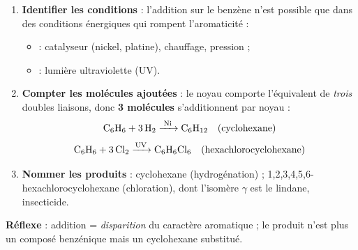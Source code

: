 \documentclass[11pt]{article}
\newcommand{\cle}[1]{{\popxbold\color{popdark}#1}}
\begin{document}
\begin{methode}
\begin{enumerate}
\item \textbf{Identifier les conditions} : l'addition sur le benzène n'est possible que dans des conditions énergiques qui rompent l'aromaticité :
\begin{itemize}
\item {} : catalyseur (nickel, platine), chauffage, pression ;
\item {} : lumière ultraviolette (UV).
\end{itemize}
\item \textbf{Compter les molécules ajoutées} : le noyau comporte l'équivalent de \emph{trois} doubles liaisons, donc \textbf{3 molécules} s'additionnent par noyau :
\[ \ce{C6H6 + 3 H2 ->[Ni] C6H12} \quad \text{(cyclohexane)} \]
\[ \ce{C6H6 + 3 Cl2 ->[UV] C6H6Cl6} \quad \text{(hexachlorocyclohexane)} \]
\item \textbf{Nommer les produits} : cyclohexane (hydrogénation) ; 1,2,3,4,5,6-hexachlorocyclohexane (chloration), dont l'isomère $\gamma$ est le \cle{lindane}, insecticide.
\end{enumerate}
\textbf{Réflexe} : addition = \emph{disparition} du caractère aromatique ; le produit n'est plus un composé benzénique mais un cyclohexane substitué.
\end{methode}
\end{document}
